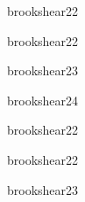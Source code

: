 \begin{syllabus}
\begin{unit}{\PFFundamentalDataStructuresDef}{brookshear}{2}{2}
    \PFFundamentalDataStructuresAllTopics
    \PFFundamentalDataStructuresAllObjectives
\end{unit}

\begin{unit}{\ALBasicAnalysisDef}{brookshear}{2}{2}
   \begin{topics}
      \item \ALBasicAnalysisTopicIdentifying
   \end{topics}

   \begin{unitgoals}
      \item \ALBasicAnalysisObjTHREE
   \end{unitgoals}
\end{unit}

\begin{unit}{\ALAlgoritmicStrategiesDef}{brookshear}{2}{3}
   \begin{topics}
      \item \ALAlgoritmicStrategiesTopicBrute
      \item \ALAlgoritmicStrategiesTopicDivide
   \end{topics}

   \begin{unitgoals}
      \item \ALAlgoritmicStrategiesObjONE
      \item \ALAlgoritmicStrategiesObjFOUR
   \end{unitgoals}
\end{unit}

\begin{unit}{\ARDigitalLogicAndDataRepresentationDef}{brookshear}{2}{4}
    \ARDigitalLogicAndDataRepresentationAllTopics
    \ARDigitalLogicAndDataRepresentationAllObjectives
\end{unit}

\begin{unit}{\ARComputerArchitectureOrganizationDef}{brookshear}{2}{2}
    \ARComputerArchitectureOrganizationAllTopics
    \ARComputerArchitectureOrganizationAllObjectives
\end{unit}

\begin{unit}{\ARMemoryArchitectureDef}{brookshear}{2}{2}
    \ARMemoryArchitectureAllTopics
    \ARMemoryArchitectureAllObjectives
\end{unit}

\begin{unit}{\ARInterfacingAndIOStrategiesDef}{brookshear}{2}{3}
    \ARInterfacingAndIOStrategiesAllTopics
    \ARInterfacingAndIOStrategiesAllObjectives
\end{unit}


\end{syllabus}
